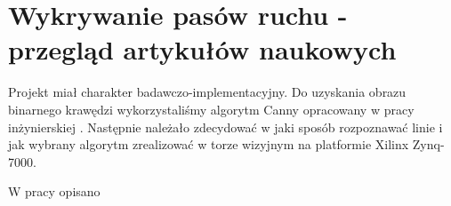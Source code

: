 \section{Wykrywanie pasów ruchu - przegląd artykułów naukowych}

Projekt miał charakter badawczo-implementacyjny. Do uzyskania obrazu binarnego krawędzi wykorzystaliśmy algorytm Canny opracowany w pracy inżynierskiej \cite{inz-canny}. Następnie należało zdecydować w jaki sposób rozpoznawać linie i jak wybrany algorytm zrealizować w torze wizyjnym na platformie Xilinx Zynq-7000.

W pracy \cite{hardware-accelerator} opisano






